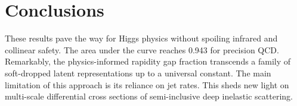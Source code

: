\section{Conclusions}\label{sec:conclusions}

These results pave the way for Higgs physics without spoiling infrared
and collinear safety. The area under the curve reaches 0.943 for
precision QCD. Remarkably, the physics-informed rapidity gap fraction
transcends a family of soft-dropped latent representations up to a
universal constant. The main limitation of this approach is its reliance
on jet rates. This sheds new light on multi-scale differential cross
sections of semi-inclusive deep inelastic scattering.

